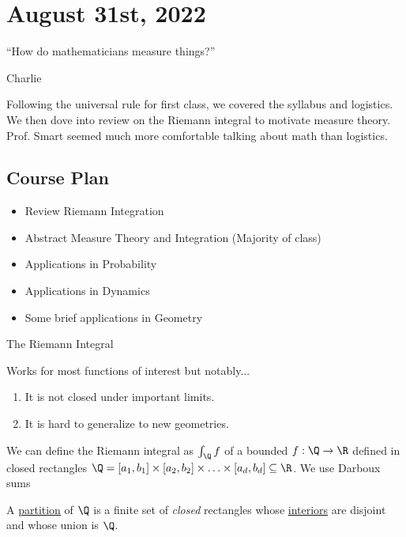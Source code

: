 \section{August 31st, 2022}

\epigraph{``How do mathematicians measure things?''}{Charlie}

Following the universal rule for first class, we covered the syllabus and logistics. We then dove into review on the Riemann integral to motivate measure theory. Prof. Smart seemed much more comfortable talking about math than logistics.

\subsection{Course Plan}
\begin{itemize}
	\item Review Riemann Integration
	\item Abstract Measure Theory and Integration (Majority of class)
	\item Applications in Probability
	\item Applications in Dynamics
	\item Some brief applications in Geometry
\end{itemize}

\begin{problem} The Riemann Integral
\item Works for most functions of interest but notably...
	\begin{enumerate}
		\item It is not closed under important limits. 
		\item It is hard to generalize to new geometries.
	\end{enumerate}
\end{problem}

\begin{definition}
	We can define the Riemann integral as $\int_{{\Q}}^{{}} {f}$ of a bounded $f : \Q \to \R$
	defined in closed rectangles
	$\Q = [a_1,b_1] \times [a_2,b_2] \times \ldots \times [a_d,b_d] \subseteq \R$. We use Darboux sums
\end{definition}

\vline
\begin{definition}[Partition]
	A \underline{partition} of $\Q$	is a finite set of \emph{closed} rectangles whose \underline{interiors} are disjoint and whose union is $\Q$.
\end{definition}

